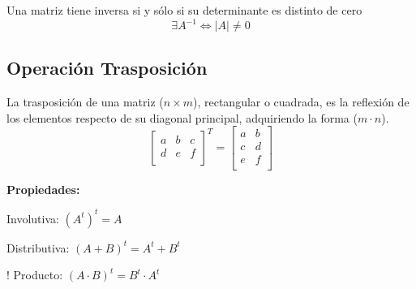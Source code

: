 \begin{teorema}
    Una matriz tiene inversa si y sólo si su determinante es distinto
    de cero
    \begin{equation*}
        \exists A^{-1} \Leftrightarrow |A| \neq 0
    \end{equation*}
\end{teorema}


\subsection{Operación Trasposición}
La trasposición de una matriz ($n \times m$), rectangular o cuadrada, es la
reflexión de los elementos respecto de su diagonal principal, adquiriendo
la forma ($m \cdot n$).
\begin{equation*}
    \begin{bmatrix}
        a & b & c \\
        d & e & f \\
    \end{bmatrix}^{T}  =
    \begin{bmatrix}
        a & b \\
        c & d \\
        e & f \\
    \end{bmatrix}
\end{equation*}

\textbf{Propiedades:}
\begin{bangenumerate}
    \item Involutiva: $(A^t)^t = A$
    \item Distributiva: $(A+B)^t = A^t + B^t$
    \item! Producto: $(A \cdot B)^t = B^t \cdot A^t$
\end{bangenumerate}


\newpage
